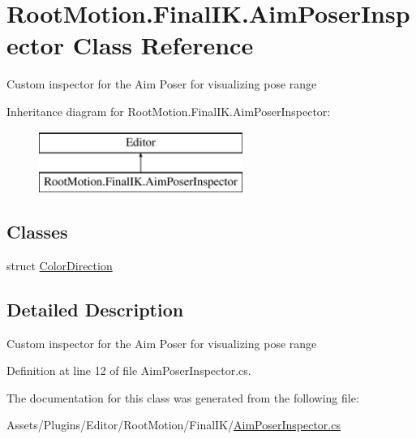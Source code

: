 \hypertarget{class_root_motion_1_1_final_i_k_1_1_aim_poser_inspector}{}\section{Root\+Motion.\+Final\+I\+K.\+Aim\+Poser\+Inspector Class Reference}
\label{class_root_motion_1_1_final_i_k_1_1_aim_poser_inspector}


Custom inspector for the Aim Poser for visualizing pose range  


Inheritance diagram for Root\+Motion.\+Final\+I\+K.\+Aim\+Poser\+Inspector\+:\begin{figure}[H]
\begin{center}
\leavevmode
\includegraphics[height=2.000000cm]{class_root_motion_1_1_final_i_k_1_1_aim_poser_inspector}
\end{center}
\end{figure}
\subsection*{Classes}
\begin{DoxyCompactItemize}
\item 
struct \mbox{\hyperlink{struct_root_motion_1_1_final_i_k_1_1_aim_poser_inspector_1_1_color_direction}{Color\+Direction}}
\end{DoxyCompactItemize}


\subsection{Detailed Description}
Custom inspector for the Aim Poser for visualizing pose range 



Definition at line 12 of file Aim\+Poser\+Inspector.\+cs.



The documentation for this class was generated from the following file\+:\begin{DoxyCompactItemize}
\item 
Assets/\+Plugins/\+Editor/\+Root\+Motion/\+Final\+I\+K/\mbox{\hyperlink{_aim_poser_inspector_8cs}{Aim\+Poser\+Inspector.\+cs}}\end{DoxyCompactItemize}
